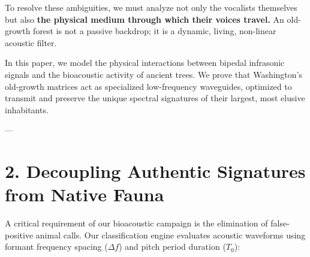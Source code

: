 \documentclass[11pt,twocolumn]{article}
\begin{document}
To resolve these ambiguities, we must analyze not only the vocalists themselves but also \textbf{the physical medium through which their voices travel.} An old-growth forest is not a passive backdrop; it is a dynamic, living, non-linear acoustic filter. 

In this paper, we model the physical interactions between bipedal infrasonic signals and the bioacoustic activity of ancient trees. We prove that Washington's old-growth matrices act as specialized low-frequency waveguides, optimized to transmit and preserve the unique spectral signatures of their largest, most elusive inhabitants.

---

\section{2. Decoupling Authentic Signatures from Native Fauna}
A critical requirement of our bioacoustic campaign is the elimination of false-positive animal calls. Our classification engine evaluates acoustic waveforms using formant frequency spacing ($\Delta f$) and pitch period duration ($T_0$):
\end{document}
